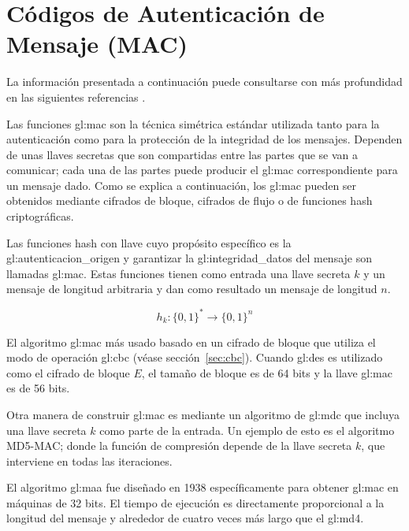 %
%

\section{Códigos de Autenticación de Mensaje (MAC)}

La información presentada a continuación puede consultarse con más profundidad
en las siguientes referencias
\cite{DBLP:series/isc/DelfsK07, menezes, mac_patel}.

Las funciones \gls{gl:mac} son la técnica simétrica
estándar utilizada tanto para la autenticación como para la protección de la
integridad de los mensajes. Dependen de unas llaves secretas que son
compartidas entre las partes que se van a comunicar; cada una de las
partes puede producir el \gls{gl:mac} correspondiente para un mensaje
dado. Como se explica a continuación, los \gls{gl:mac} pueden ser
obtenidos mediante cifrados de bloque, cifrados de flujo o de funciones
hash criptográficas.

Las funciones hash con llave cuyo propósito específico es la
\gls{gl:autenticacion_origen} y garantizar la \gls{gl:integridad_datos} del
mensaje son llamadas \gls{gl:mac}. Estas funciones tienen como entrada
una llave secreta $k$ y un mensaje de longitud arbitraria y dan como resultado
un mensaje de longitud $n$.

\begin{equation}
  \label{funcion_hash_mac}
  h_k: \{0, 1\}^* \longrightarrow \{0,1\}^n
\end{equation}

El algoritmo \gls{gl:mac} más usado basado en un cifrado de bloque que
utiliza el modo de operación \gls{gl:cbc} (véase sección~\ref{sec:cbc}).
Cuando \gls{gl:des} es utilizado como el cifrado de bloque $E$, el tamaño
de bloque es de 64 bits y la llave \gls{gl:mac} es de 56 bits.

Otra manera de construir \gls{gl:mac} es mediante un algoritmo
de \gls{gl:mdc} que incluya una llave secreta $k$ como parte de la
entrada. Un ejemplo de esto es el algoritmo MD5-MAC; donde la función de
compresión depende de la llave secreta $k$, que interviene en todas las
iteraciones.

El algoritmo \gls{gl:maa} fue diseñado en 1938 específicamente para
obtener \gls{gl:mac} en máquinas de 32 bits. El tiempo de ejecución
es directamente proporcional a la longitud del mensaje y alrededor de cuatro
veces más largo que el \gls{gl:md4}.

